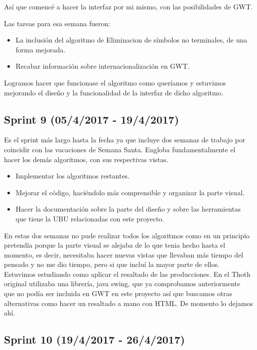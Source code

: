 Así que comencé a hacer la interfaz por mi mismo, con las posibilidades de GWT.

Las tareas para esa semana fueron: 

\begin{itemize}
\item La inclusión del algoritmo de Eliminacion de símbolos no terminales, de una forma mejorada.
\item Recabar información sobre internacionalización en GWT.
\end{itemize}

Logramos hacer que funcionase el algoritmo como queríamos y estuvimos mejorando el diseño y la funcionalidad de la interfaz de dicho algoritmo.

\subsection{Sprint 9 (05/4/2017 - 19/4/2017)}

Es el sprint más largo hasta la fecha ya que incluye dos semanas de trabajo por coincidir con las vacaciones de Semana Santa. Engloba fundamentalmente el hacer los demás algoritmos, con sus respectivas vistas.

\begin{itemize}
\item Implementar los algoritmos restantes.
\item Mejorar el código, haciéndolo más comprensible y organizar la parte visual.
\item Hacer la documentación sobre la parte del diseño y sobre las herramientas que tiene la UBU relacionadas con este proyecto.
\end{itemize}

En estas dos semanas no pude realizar todos los algoritmos como en un principio pretendía porque la parte visual se alejaba de lo que tenia hecho hasta el momento, es decir, necesitaba hacer nuevas vistas que llevaban más tiempo del pensado y no me dio tiempo, pero si que incluí la mayor parte de ellos. Estuvimos estudiando como aplicar el resaltado de las producciones. En el Thoth original utilizaba una librería, java swing, que ya comprobamos anteriormente que no podía ser incluida en GWT en este proyecto así que buscamos otras alternativas como hacer un resaltado a mano con HTML. De momento lo dejamos ahí.

\subsection{Sprint 10 (19/4/2017 - 26/4/2017)}

